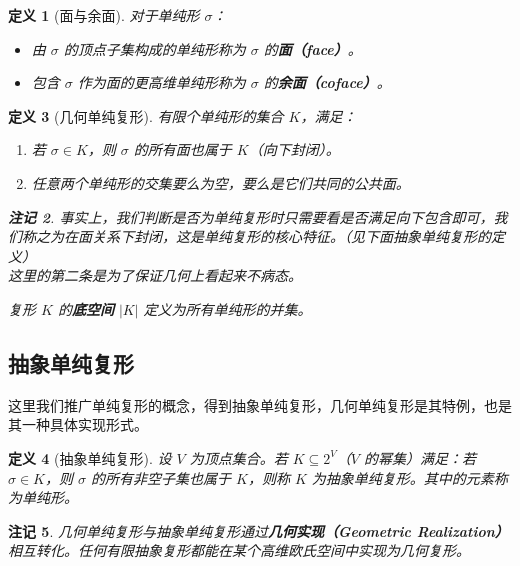 \documentclass[UTF8]{ctexart}
\newtheorem{definition}{定义}[section]
\newtheorem{remark}[definition]{注记}
\begin{document}
\begin{definition}[面与余面]
\label{def:face-coface}
对于单纯形 \(\sigma\)：
\begin{itemize}
    \item 由 \(\sigma\) 的顶点子集构成的单纯形称为 \(\sigma\) 的\textbf{面（face）}。
    \item 包含 \(\sigma\) 作为面的更高维单纯形称为 \(\sigma\) 的\textbf{余面（coface）}。
\end{itemize}
\end{definition}

\begin{definition}[几何单纯复形]
\label{def:geometric-complex}
有限个单纯形的集合 \(K\)，满足：
\begin{enumerate}
    \item 若 \(\sigma \in K\)，则 \(\sigma\) 的所有面也属于 \(K\)（向下封闭）。
    \item 任意两个单纯形的交集要么为空，要么是它们共同的公共面。
\end{enumerate}
\begin{remark}
事实上，我们判断是否为单纯复形时只需要看是否满足向下包含即可，我们称之为在面关系下封闭，这是单纯复形的核心特征。（见下面抽象单纯复形的定义）\\
这里的第二条是为了保证几何上看起来不病态。
\end{remark}
复形 \(K\) 的\textbf{底空间} \(|K|\) 定义为所有单纯形的并集。
\end{definition}

\subsection{抽象单纯复形}
\label{subsec:abstract-complex}

这里我们推广单纯复形的概念，得到抽象单纯复形，几何单纯复形是其特例，也是其一种具体实现形式。

\begin{definition}[抽象单纯复形]
\label{def:abstract-complex}
设 \(V\) 为顶点集合。若 \(K \subseteq 2^V\)（\(V\) 的幂集）满足：若 \(\sigma \in K\)，则 \(\sigma\) 的所有非空子集也属于 \(K\)，则称 \(K\) 为抽象单纯复形。其中的元素称为单纯形。
\end{definition}

\begin{remark}
几何单纯复形与抽象单纯复形通过\textbf{几何实现（Geometric Realization）}相互转化。任何有限抽象复形都能在某个高维欧氏空间中实现为几何复形。
\end{remark}
\end{document}
